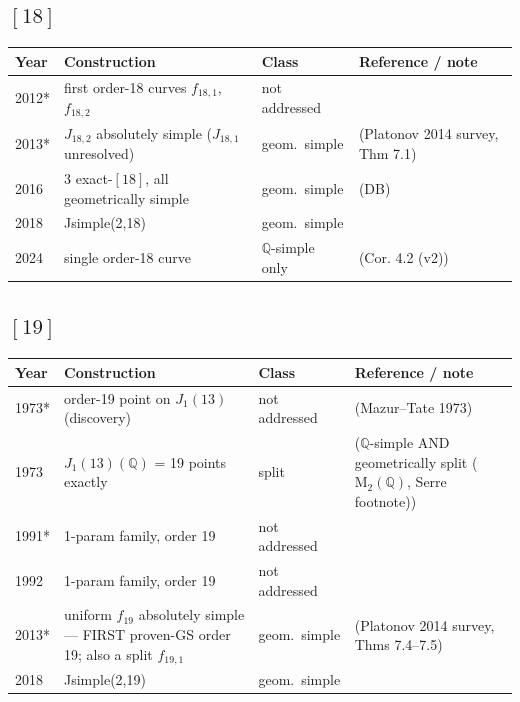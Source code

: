 \documentclass[10pt]{amsart}
\begin{document}
\subsection*{$[18]$}
\begin{longtable}{p{0.9cm} p{7.6cm} p{2.3cm} p{4.2cm}}
\hline Year & Construction & Class & Reference / note \\ \hline
2012* & first order-18 curves $f_{18,1}$, $f_{18,2}$ & not addressed & \cite{PP2012}\\
2013* & $J_{18,2}$ absolutely simple ($J_{18,1}$ unresolved) & geom.\ simple & \cite{PZP2013} (Platonov 2014 survey, Thm 7.1)\\
2016 & 3 exact-$[18]$, all geometrically simple & geom.\ simple & \cite{BSSVY} (DB)\\
2018 & Jsimple(2,18) & geom.\ simple & \cite{Nicholls2018}\\
2024 & single order-18 curve & $\mathbb{Q}$-simple only & \cite{SadekSuluyer2024} (Cor. 4.2 (v2))\\
\hline\end{longtable}
\subsection*{$[19]$}
\begin{longtable}{p{0.9cm} p{7.6cm} p{2.3cm} p{4.2cm}}
\hline Year & Construction & Class & Reference / note \\ \hline
1973* & order-19 point on $J_1(13)$ (discovery) & not addressed & \cite{Ogg1973} (Mazur--Tate 1973)\\
1973 & $J_1(13)(\mathbb{Q})$ = 19 points exactly & split & \cite{MazurTate1973} ($\mathbb{Q}$-simple AND geometrically split ($\mathrm{M}_2(\mathbb{Q})$, Serre footnote))\\
1991* & 1-param family, order 19 & not addressed & \cite{Leprevost1991b}\\
1992 & 1-param family, order 19 & not addressed & \cite{Leprevost1992}\\
2013* & uniform $f_{19}$ absolutely simple --- FIRST proven-GS order 19; also a split $f_{19,1}$ & geom.\ simple & \cite{PZP2013} (Platonov 2014 survey, Thms 7.4--7.5)\\
2018 & Jsimple(2,19) & geom.\ simple & \cite{Nicholls2018}\\
\hline\end{longtable}
\end{document}
